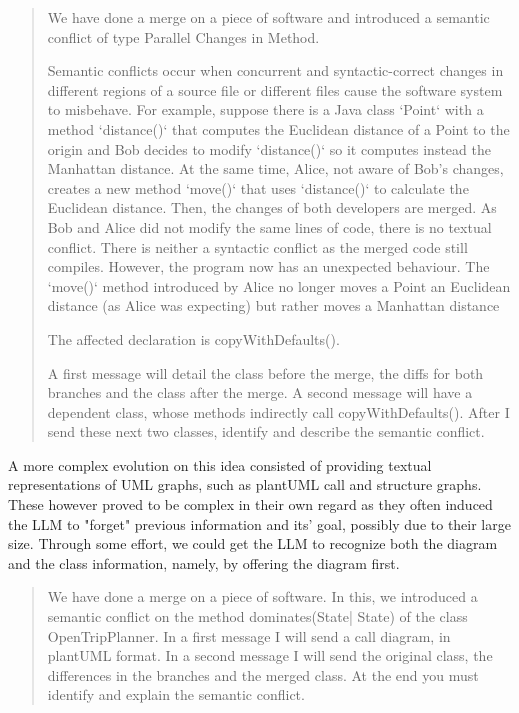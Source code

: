 \begin{quote}
We have done a merge on a piece of software and introduced a semantic conflict of type Parallel Changes in Method.

Semantic conflicts occur when concurrent and syntactic-correct changes in different regions of a source file or different files cause the software system to misbehave. For example, suppose there is a Java class `Point` with a method `distance()` that computes the Euclidean distance of a Point to the origin and Bob decides to modify `distance()` so it computes instead the Manhattan distance. At the same time, Alice, not aware of Bob's changes, creates a new method `move()` that uses `distance()` to calculate the Euclidean distance. Then, the changes of both developers are merged. As Bob and Alice did not modify the same lines of code, there is no textual conflict. There is neither a syntactic conflict as the merged code still compiles. However, the program now has an unexpected behaviour. The `move()` method introduced by Alice no longer moves a Point an Euclidean distance (as Alice was expecting) but rather moves a Manhattan distance

The affected declaration is copyWithDefaults().

A first message will detail the class before the merge, the diffs for both branches and the class after the merge. A second message will have a dependent class, whose methods indirectly call copyWithDefaults(). After I send these next two classes, identify and describe the semantic conflict.    
\end{quote}

A more complex evolution on this idea consisted of providing textual representations of UML graphs, such as plantUML call and structure graphs. These however proved to be complex in their own regard as they often induced the LLM to "forget" previous information and its' goal, possibly due to their large size. Through some effort, we could get the LLM to recognize both the diagram and the class information, namely, by offering the diagram first.

\begin{quote}
We have done a merge on a piece of software. In this, we introduced a semantic conflict on the method dominates(State| State) of the class OpenTripPlanner. In a first message I will send a call diagram, in plantUML format. In a second message I will send the original class, the differences in the branches and the merged class.  At the end you must identify and explain the semantic conflict.
\end{quote}

